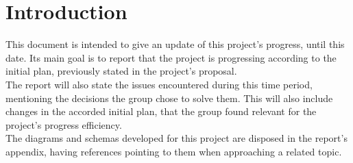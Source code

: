 %
%

\chapter{Introduction}

This document is intended to give an update of this project's progress, until this date. 
Its main goal is to report that the project is progressing according to the
initial plan, previously stated in the project's proposal.\\

The report will also state the issues encountered during this time period, mentioning the 
decisions the group chose to solve them. This will also include changes in the accorded
initial plan, that the group found relevant for the project's progress efficiency.\\

The diagrams and schemas developed for this project are disposed in the report's appendix,
having references pointing to them when approaching a related topic.